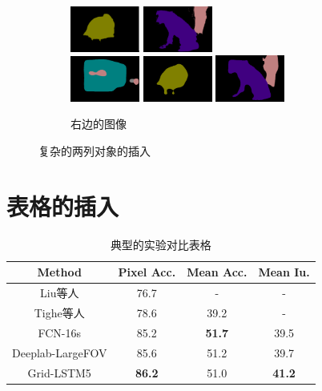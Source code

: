 \begin{figure}[h!]
\begin{subfigure}{0.4\textwidth}
		\includegraphics[width=0.25\textwidth]{image/result/compare/deeplab_bird.png}
		\includegraphics[width=0.25\textwidth]{image/result/compare/deeplab_dog.png} \\
		\includegraphics[width=0.25\textwidth]{image/result/compare/my_bus.png}
		\includegraphics[width=0.25\textwidth]{image/result/compare/my_bird.png}
		\includegraphics[width=0.25\textwidth]{image/result/compare/my_dog.png} 
		\caption{右边的图像}
		\label{fig:compare2}
	\end{subfigure}
	\caption{复杂的两列对象的插入}
	\label{fig:complex}
\end{figure}



\clearpage

\section{表格的插入}
\label{sec:tables}


\begin{table}[h] %
	\centering
		\begin{tabular}{*{4}{c}}
			\toprule
	 		Method & Pixel Acc. & Mean Acc. & Mean Iu.\\
			\midrule
			Liu等人\cite{liu2011sift}  & 76.7 & - & -\\
		Tighe等人\cite{tighe2013finding}  & 78.6 & 39.2 & -\\
			FCN-16s\cite{long2015fully} & 85.2 & \textbf{51.7} & 39.5\\
			Deeplab-LargeFOV\cite{chen14semantic} & 85.6 & 51.2 & 39.7\\
			\midrule
			Grid-LSTM5 & \textbf{86.2} & 51.0 & \textbf{41.2}\\
			\bottomrule
		\end{tabular}
		\caption{典型的实验对比表格}		
		\label{tab:siftflow}
\end{table}


